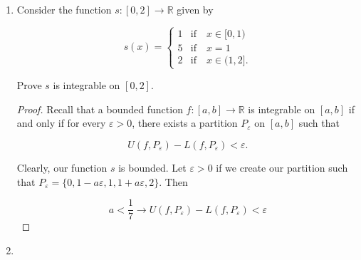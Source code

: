 \documentclass{article}
\theoremstyle{definition}
\theoremstyle{remark}
\theoremstyle{definition}
\begin{document}
\begin{enumerate}[leftmargin=*]
\begin{proof}
        \begin{equation*}
            \begin{split}
                &\lim_{n\rightarrow\infty}\frac{\frac{1}{2}x_n-\frac{1}{2}0}{x_n-0}=\lim_{n\rightarrow\infty}\frac{\frac{1}{2}x_n}{x_n}=\frac{1}{2},\\
                &\lim_{n\rightarrow\infty}\frac{y_n-0}{y_n-0}=\lim_{n\rightarrow\infty}\frac{y_n}{y_n}=1.
            \end{split}
        \end{equation*}
        
        \noindent Thus, $\displaystyle{\lim_{n\rightarrow\infty}}f(x_n)\neq\displaystyle{\lim_{n\rightarrow\infty}}f(y_n)$. Thus, $f(x)$ is not continuous at 0 and therefore not differentiable at 0.
    \end{proof}
    
    \newpage
    
    \item Consider the function $s\colon[0,2]\rightarrow\mathbb{R}$ given by 
    
    \begin{equation*}
        s(x)=\begin{cases}1&\text{if}\quad x\in[0,1) \\ 5&\text{if}\quad x=1\\2&\text{if}\quad x\in(1,2]. \end{cases}
    \end{equation*}
    
    \noindent Prove $s$ is integrable on $[0,2]$.
    
    \begin{proof}
        Recall that a bounded function $f\colon[a,b]\rightarrow\mathbb{R}$ is integrable on $[a,b]$ if and only if for every $\varepsilon>0$, there exists a partition $P_{\varepsilon}$ on $[a,b]$ such that 
        
        \begin{equation*}
            U(f,P_{\varepsilon})-L(f,P_{\varepsilon})<\varepsilon.
        \end{equation*}
        
        \noindent Clearly, our function $s$ is bounded. Let $\varepsilon>0$ if we create our partition such that $P_{\varepsilon}=\{0,1-a\varepsilon,1,1+a\varepsilon,2\}$. Then 
        
        \begin{equation*}
           a<\frac{1}{7}\rightarrow U(f,P_{\varepsilon})-L(f,P_{\varepsilon})<\varepsilon
        \end{equation*}
    \end{proof}
    
    \item 
    
\end{enumerate}
\end{document}
